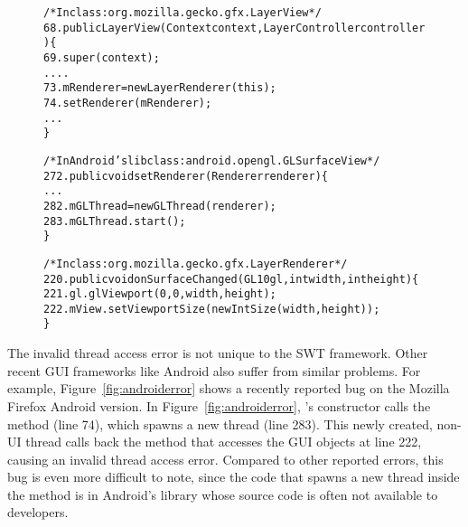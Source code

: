 \begin{figure}[t]
\begin{CodeOut}
\begin{alltt}

     /* In class: org.mozilla.gecko.gfx.LayerView */
68.  public LayerView(Context context, LayerController controller) \{
69.     super(context);
        ....
73.     mRenderer = new LayerRenderer(this);
74.     setRenderer(mRenderer);
        ...
     \}

     /* In Android's lib class: android.opengl.GLSurfaceView */
272. public void setRenderer(Renderer renderer) \{
        ...
282.    mGLThread = new GLThread(renderer);
283.    mGLThread.start();   
     \}

     /* In class: org.mozilla.gecko.gfx.LayerRenderer */
220. public void onSurfaceChanged(GL10 gl, int width, int height) \{
221.    gl.glViewport(0, 0, width, height);
222.    mView.setViewportSize(new IntSize(width, height));
     \}

\end{alltt}
\end{CodeOut}
\vspace*{-2.0ex}  %
\end{figure}

The invalid thread access error is not unique to the SWT framework. Other recent GUI frameworks
like Android also suffer from similar problems. For example, 
Figure~\ref{fig:androiderror} shows a recently reported bug on the Mozilla Firefox Android version.
In Figure~\ref{fig:androiderror}, 's constructor calls the
 method (line 74), which spawns a new thread (line 283).
This newly created, non-UI thread calls back the  method that
accesses the GUI objects at line 222, causing an invalid thread access error.
Compared to other reported errors, this bug is even more difficult to note, 
since the code that spawns a new thread inside the  method is
in Android's library whose source code is often not available to developers.

